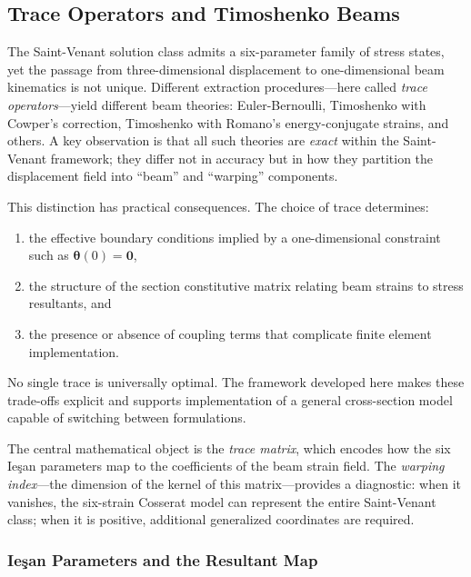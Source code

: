

\subsection{Trace Operators and Timoshenko Beams}%

The Saint-Venant solution class admits a six-parameter family of stress states, 
yet the passage from three-dimensional displacement to one-dimensional beam 
kinematics is not unique. Different extraction procedures---here called 
\emph{trace operators}---yield different beam theories: Euler-Bernoulli, 
Timoshenko with Cowper's correction, Timoshenko with Romano's energy-conjugate 
strains, and others. A key observation is that all such theories are 
\emph{exact} within the Saint-Venant framework; they differ not in accuracy 
but in how they partition the displacement field into ``beam'' and ``warping'' 
components.

This distinction has practical consequences. The choice of trace determines:
\begin{enumerate}
    \item the effective boundary conditions implied by a one-dimensional 
    constraint such as $\bm{\theta}(0) = \mathbf{0}$,
    \item the structure of the section constitutive matrix relating beam 
    strains to stress resultants, and
    \item the presence or absence of coupling terms that complicate 
    finite element implementation.
\end{enumerate}
No single trace is universally optimal. The framework developed here makes 
these trade-offs explicit and supports implementation of a general 
cross-section model capable of switching between formulations.

The central mathematical object is the \emph{trace matrix}, which encodes 
how the six Ie\c{s}an parameters map to the coefficients of the beam strain 
field. The \emph{warping index}---the dimension of the kernel of this 
matrix---provides a diagnostic: when it vanishes, the six-strain Cosserat 
model can represent the entire Saint-Venant class; when it is positive, 
additional generalized coordinates are required.

\subsubsection{Ie\c{s}an Parameters and the Resultant Map}

